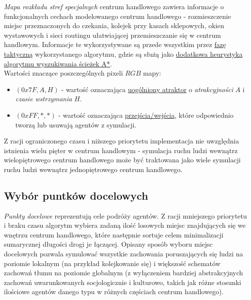 \documentclass[a4paper, 12pt]{article}
\begin{document}
        \emph{Mapa rozkładu stref specjalnych} centrum handlowego zawiera informacje o funkcjonalnych cechach modelowanego centrum handlowego - rozmieszczenie miejsc przeznaczonych do czekania, kolejek przy kasach sklepowych, okien wystawowych i sieci routingu ułatwiającej przemieszczanie się w centrum handlowym. Informacje te wykorzystywane są przede wszystkim przez \hyperref[sec:tactical]{fazę taktyczną} wykorzystanego algorytmu, gdzie są służą jako \hyperref[sec:path-deviation]{dodatkowa heurystyka} \hyperref[sec:path-finding]{algorytmu wyszukiwania ścieżek A*}. \\

\noindent
Wartości znaczące poszczególnych pixeli $RGB$ mapy:

        \begin{itemize}
            \item $(0x7F, A, H)$ - wartość oznaczająca \hyperref[sec:path-deviation]{uogólniony atraktor} o \emph{atrakcyjności} $A$ i \emph{czasie wstrzymania} $H$.
            \item $(0xFF, *, *)$ - wartość oznaczająca \hyperref[sec:entrance-exits]{przejścia/wejścia}, które odpowiednio tworzą lub usuwają agentów z symulacji.
        \end{itemize}

\noindent
Z racji ograniczonego czasu i niższego priorytetu implementacja nie uwzględnia istnienia wielu pięter w centrum handlowym - symulacja ruchu ludzi wewnątrz wielopiętrowego centrum handlowego może być traktowana jako wiele symulacji ruchu ludzi wewnątrz jednopiętrowego centrum handlowego.

        \subsection{Wybór puntków docelowych}
        \label{sec:destination-choice}

        \emph{Punkty docelowe} reprezentują cele podróży agentów. Z racji mniejszego priorytetu i braku czasu algorytm wybiera zadaną ilość losowych miejsc znajdujących się we wnętrzu centrum handlowego, które następnie sortuje celem minimalizacji sumarycznej długości drogi je łączącej. Opisany sposób wyboru miejsc docelowych pozwala symulować wszystkie zachowania poruszających się ludzi na poziomie lokalnym (na przykład kolejkowanie się) i większość schematów zachowań tłumu na poziomie globalnym (z wyłączeniem bardziej abstrakcyjnych zachowań uwarunkowanych socjologicznie i kulturowo, takich jak różne stosunki ilościowe agentów danego typu w różnych częściach centrum handlowego).
\end{document}
